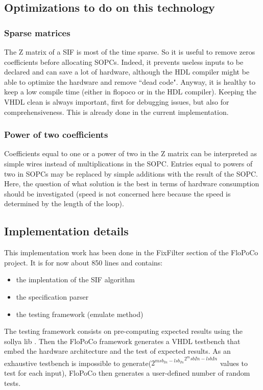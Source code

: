 \subsection{Optimizations to do on this technology}
	\subsubsection{Sparse matrices}
		The Z matrix of a SIF is most of the time sparse.
		So it is useful to remove zeros coefficients before allocating SOPCs.
		Indeed, it prevents useless inputs to be declared and can save a lot of hardware,
		although the HDL compiler might be able to optimize the hardware and remove ``dead code".
		Anyway, it is healthy to keep a low compile time (either in flopoco or in the HDL compiler).
		Keeping the VHDL clean is always important, first for debugging issues, but also for comprehensiveness.
		This is already done in the current implementation.

	\subsubsection{Power of two coefficients}
		Coefficients equal to one or a power of two in the Z matrix can be interpreted as simple wires instead of multiplications in the SOPC.
		Entries equal to powers of two in SOPCs may be replaced by simple additions with the result of the SOPC.
		Here, the question of what solution is the best in terms of hardware consumption should be investigated
		(speed is not concerned here because the speed is determined by the length of the loop).

	\subsection{Implementation details}
	This implementation work has been done in the FixFilter section of the FloPoCo project.
	It is for now about 850 lines and contains:
	\begin{itemize}
		\item the implentation of the SIF algorithm
		\item the specification parser
		\item the testing framework (emulate method)
	\end{itemize}

	The testing framework consists on pre-computing expected results using the sollya lib \cite{ChevillardJoldesLauter2010}.
	Then the FloPoCo framework generates a VHDL testbench that embed the hardware architecture and the test of expected results.
	As an exhaustive testbench is impossible to generate(${2^{msb_{In} - lsb_{In}}}^{2^msb{In} - lsb{In}}$ values to test for each input),
	FloPoCo then generates a user-defined number of random tests.

